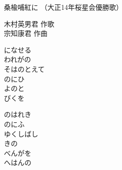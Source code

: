 \documentclass[10pt,b5j]{tarticle} %
\begin{document}
\begin{minipage}[c]{0.7\hsize} %
    \begin{center}
        {\LARGE
            桑楡哺紅に %
        }
        {\small 
            （大正14年桜星会優勝歌） %
        }
    \end{center}
\end{minipage}
\begin{minipage}[c]{0.3\hsize} %
    \begin{flushright} %
        木村英男君 作歌\\宗知康君 作曲 %
    \end{flushright}
\end{minipage}

\vspace{1.5em} %
\newcommand{\linespace}{0.5em} %
\newcommand{\blocksize}{0.5\hsize} %
\begin{enumerate} %
    \begin{minipage}[c]{\blocksize}
    
        \vspace{\linespace}
        \item
        になせる\\
        われがの\\
        そはのとえて\\
        のにひ\\
        よのと\\
        びくを
        
        \vspace{\linespace}
        \item
        のはれき\\
        のにふ\\
        ゆくしばし\\
        きの\\
        べんがを\\
        へはんの
    
    \end{minipage}
\end{enumerate} %
\end{document}
